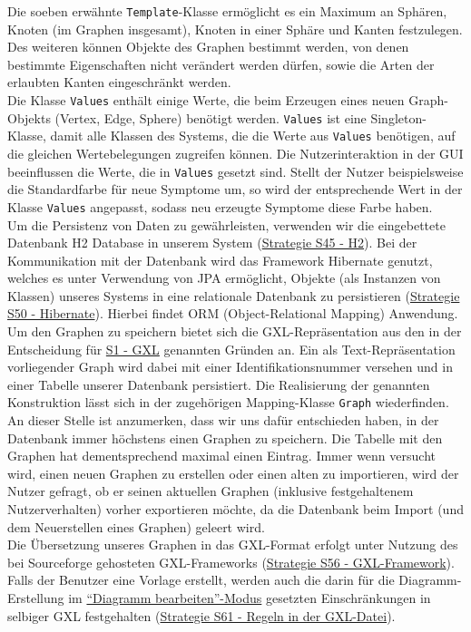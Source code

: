 \documentclass[enabledeprecatedfontcommands,fontsize=11pt,paper=a4,twoside]{scrartcl}
\begin{document}
	Die soeben erwähnte \texttt{Template}-Klasse ermöglicht es ein Maximum an Sphären, Knoten (im Graphen insgesamt), Knoten in einer Sphäre und Kanten festzulegen. Des weiteren können Objekte des Graphen bestimmt werden, von denen bestimmte Eigenschaften nicht verändert werden dürfen, sowie die Arten der erlaubten Kanten eingeschränkt werden.\\
	
	Die Klasse \texttt{Values} enthält einige Werte, die beim Erzeugen eines neuen Graph-Objekts (Vertex, Edge, Sphere) benötigt werden. \texttt{Values} ist eine Singleton-Klasse, damit alle Klassen des Systems, die die Werte aus \texttt{Values} benötigen, auf die gleichen Wertebelegungen zugreifen können. Die Nutzerinteraktion in der GUI beeinflussen die Werte, die in \texttt{Values} gesetzt sind. Stellt der Nutzer beispielsweise die Standardfarbe für neue Symptome um, so wird der entsprechende Wert in der Klasse \texttt{Values} angepasst, sodass neu erzeugte Symptome diese Farbe haben.\\
	
	Um die Persistenz von Daten zu gewährleisten, verwenden wir die eingebettete Datenbank H2 Database in unserem System (\hyperlink{ppp}{Strategie S45 - H2}). Bei der Kommunikation mit der Datenbank wird das Framework Hibernate genutzt, welches es unter Verwendung von JPA ermöglicht, Objekte (als Instanzen von Klassen) unseres Systems in eine relationale Datenbank zu persistieren (\hyperlink{rrr}{Strategie S50 - Hibernate}). Hierbei findet ORM (Object-Relational Mapping) Anwendung. \\ 
	
	Um den Graphen zu speichern bietet sich die GXL-Repräsentation aus den in der Entscheidung für \hyperlink{yy}{S1 - GXL} genannten Gründen an. Ein als Text-Repräsentation vorliegender Graph wird dabei mit einer Identifikationsnummer versehen und in einer Tabelle unserer Datenbank persistiert. Die Realisierung der genannten Konstruktion lässt sich in der zugehörigen Mapping-Klasse \texttt{Graph} wiederfinden.  An dieser Stelle ist anzumerken, dass wir uns dafür entschieden haben, in der Datenbank immer höchstens einen Graphen zu speichern. Die Tabelle mit den Graphen hat dementsprechend maximal einen Eintrag. Immer wenn versucht wird, einen neuen Graphen zu erstellen oder einen alten zu importieren, wird der Nutzer gefragt, ob er seinen aktuellen Graphen (inklusive festgehaltenem Nutzerverhalten) vorher exportieren möchte, da die Datenbank beim Import (und dem Neuerstellen eines Graphen) geleert wird.\\
	Die Übersetzung unseres Graphen in das GXL-Format erfolgt unter Nutzung des bei Sourceforge gehosteten GXL-Frameworks (\hyperlink{ttt}{Strategie S56 - GXL-Framework}). Falls der Benutzer eine Vorlage erstellt, werden auch die darin für die Diagramm-Erstellung im \hyperlink{``Diagramm bearbeiten''-Modus}{``Diagramm bearbeiten''-Modus} gesetzten Einschränkungen in selbiger GXL festgehalten (\hyperlink{vvv}{Strategie S61 - Regeln in der GXL-Datei}).\\ 
	
\end{document}
